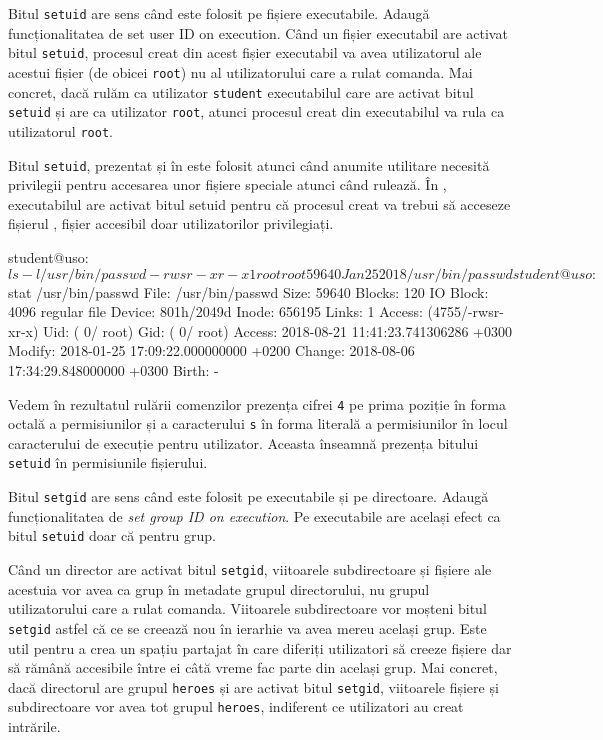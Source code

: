 Bitul \texttt{setuid} are sens când este folosit pe fișiere executabile.
Adaugă funcționalitatea de set user ID on execution.
Când un fișier executabil are activat bitul \texttt{setuid}, procesul creat din acest fișier executabil va avea utilizatorul ale acestui fișier (de obicei \texttt{root}) nu al utilizatorului care a rulat comanda.
Mai concret, dacă rulăm ca utilizator \texttt{student} executabilul  care are activat bitul \texttt{setuid} și are ca utilizator \texttt{root}, atunci procesul creat din executabilul  va rula ca utilizatorul \texttt{root}.

Bitul \texttt{setuid}, prezentat și în  este folosit atunci când anumite utilitare necesită privilegii pentru accesarea unor fișiere speciale atunci când rulează.
În , executabilul  are activat bitul setuid pentru că procesul creat va trebui să acceseze fișierul , fișier accesibil doar utilizatorilor privilegiați.

\begin{screen}[caption={Folosirea bitului setuid},label={lst:user:use-setuid}]
student@uso:~$ ls -l /usr/bin/passwd
-rwsr-xr-x 1 root root 59640 Jan 25  2018 /usr/bin/passwd
student@uso:~$ stat /usr/bin/passwd
  File: /usr/bin/passwd
  Size: 59640             Blocks: 120        IO Block: 4096   regular file
Device: 801h/2049d        Inode: 656195      Links: 1
Access: (4755/-rwsr-xr-x)  Uid: (    0/    root)   Gid: (    0/    root)
Access: 2018-08-21 11:41:23.741306286 +0300
Modify: 2018-01-25 17:09:22.000000000 +0200
Change: 2018-08-06 17:34:29.848000000 +0300
 Birth: -
\end{screen}

Vedem în rezultatul rulării comenzilor prezența cifrei \texttt{4} pe prima poziție în forma octală a permisiunilor și a caracterului \texttt{s} în forma literală a permisiunilor în locul caracterului de execuție pentru utilizator.
Aceasta înseamnă prezența bitului \texttt{setuid} în permisiunile fișierului.

Bitul \texttt{setgid} are sens când este folosit pe executabile și pe directoare.
Adaugă funcționalitatea de \textit{set group ID on execution}.
Pe executabile are același efect ca bitul \texttt{setuid} doar că pentru grup.

Când un director are activat bitul \texttt{setgid}, viitoarele subdirectoare și fișiere ale acestuia vor avea ca grup în metadate grupul directorului, nu grupul utilizatorului care a rulat comanda.
Viitoarele subdirectoare vor moșteni bitul \texttt{setgid} astfel că ce se creează nou în ierarhie va avea mereu același grup.
Este util pentru a crea un spațiu partajat în care diferiți utilizatori să creeze fișiere dar să rămână accesibile între ei câtă vreme fac parte din același grup.
Mai concret, dacă directorul  are grupul \texttt{heroes} și are activat bitul \texttt{setgid}, viitoarele fișiere și subdirectoare vor avea tot grupul \texttt{heroes}, indiferent ce utilizatori au creat intrările.

